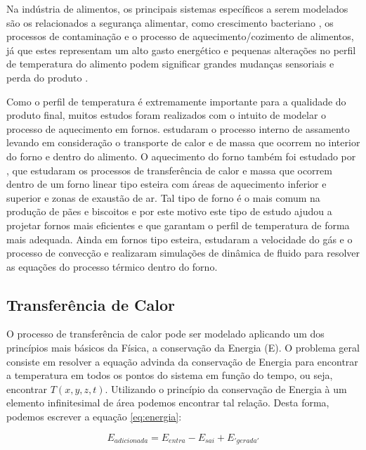 Na indústria de alimentos, os principais sistemas específicos a serem modelados são os relacionados a segurança alimentar, como crescimento bacteriano \citep{bacteriano}, os processos de contaminação \citep{contaminacao} e o processo de aquecimento/cozimento de alimentos, já que estes representam um alto gasto energético \citep{modelling-heat-bread} e pequenas alterações no perfil de temperatura do alimento podem  significar grandes mudanças sensoriais e perda do produto \citep{computer-aid}. 

Como o perfil de temperatura é extremamente importante para a qualidade do produto final, muitos estudos foram realizados com o intuito de modelar o processo de aquecimento em fornos. \citet{bread-baking} estudaram o processo interno de assamento levando em consideração o transporte de calor e de massa que ocorrem no interior do forno e dentro do alimento. O aquecimento do forno também foi estudado por \citet{modelling-heat-bread}, que estudaram os processos de transferência de calor e massa que ocorrem dentro de um forno linear tipo esteira com áreas de aquecimento inferior e superior e zonas de exaustão de ar. Tal tipo de forno é o mais comum na produção de pães e biscoitos e por este motivo este tipo de estudo ajudou a projetar fornos mais eficientes e que garantam o perfil de temperatura de forma mais adequada. Ainda em fornos tipo esteira, \citet{numerical-gas-flow} estudaram a velocidade do gás e o processo de convecção e \citet{cfd-modeling} realizaram simulações de dinâmica de fluido para resolver as equações do processo térmico dentro do forno.

\subsection{Transferência de Calor}

O processo de transferência de calor pode ser modelado aplicando um dos princípios mais básicos da Física, a conservação da Energia (E). O problema geral consiste em resolver a equação advinda da conservação de Energia para encontrar a temperatura em todos os pontos do sistema em função do tempo, ou seja, encontrar $T(x,y,z,t)$. Utilizando o princípio da conservação de Energia à um elemento infinitesimal de área podemos encontrar tal relação. Desta forma, podemos escrever a equação \ref{eq:energia}:

\begin{equation}\label{eq:energia}
E_{adicionada} = E_{entra} - E_{sai} + E_{'gerada'}
\end{equation}

